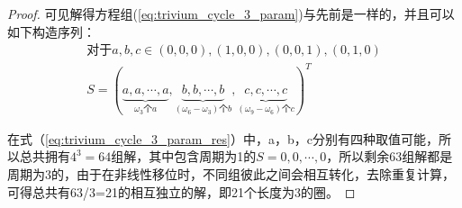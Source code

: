 \begin{thm}
\begin{proof}
可见解得方程组(\ref{eq:trivium_cycle_3_param})与先前是一样的，并且可以如下构造序列：
\begin{align}
\label{eq:trivium_cycle_3_param_res}
\text{对于}a, b, c \in {(0, 0, 0), (1, 0, 0), (0, 0, 1), (0, 1, 0)}\\
S = (\underbrace{a,a,\cdots,a}_{\omega_{3}\text{个}a},\underbrace{b,b,\cdots,b}_{(\omega_{6}-\omega_{3})\text{个}b},\underbrace{c,c,\cdots,c}_{(\omega_{9}-\omega_{6})\text{个}c})^{T}
\end{align}

在式（\ref{eq:trivium_cycle_3_param_res}）中，a，b，c分别有四种取值可能，所以总共拥有$4^{3}=64$组解，其中包含周期为1的$S={0,0,\cdots,0}$，所以剩余63组解都是周期为3的，由于在非线性移位时，不同组彼此之间会相互转化，去除重复计算，可得总共有63/3=21的相互独立的解，即21个长度为3的圈。

\end{proof}
\end{thm}
